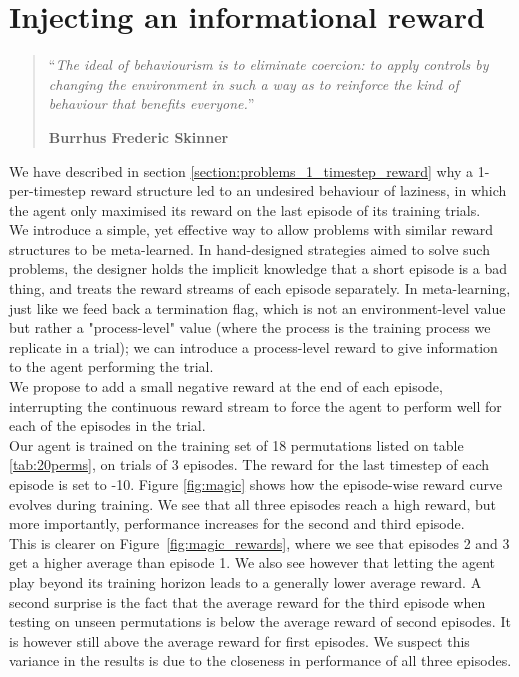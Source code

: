 \chapter{Injecting an informational reward}
\begin{quotation}
\noindent ``\emph{The ideal of behaviourism is to eliminate coercion: to apply
	controls by changing the environment in such a way as to reinforce the
	kind of behaviour that benefits everyone.}''
\begin{flushright}\textbf{Burrhus Frederic Skinner}\end{flushright}
\end{quotation}
\vspace*{0.5cm}


We have described in section \ref{section:problems_1_timestep_reward} why
a 1-per-timestep reward structure led to an undesired behaviour of laziness,
in which the agent only maximised its reward on the last episode of its
training trials.\\

We introduce a simple, yet effective way to allow problems with similar 
reward structures to be meta-learned. In hand-designed strategies aimed to
solve such problems, the designer holds the implicit knowledge that a short
episode is a bad thing, and treats the reward streams of each episode 
separately. In meta-learning, just like we feed back a termination flag, which
is not an environment-level value but rather a "process-level" value (where
the process is the training process we replicate in a trial); we can
introduce a process-level reward to give information to the agent 
performing the trial.\\

We propose to add a small negative reward at the end of each episode, 
interrupting the continuous reward stream to force the agent to perform
well for each of the episodes in the trial.\\

Our agent is trained on the training set of 18 permutations listed on table
\ref{tab:20perms}, on trials of 3 episodes. The reward for the last 
timestep of each episode is set to -10. Figure \ref{fig:magic} shows how
the episode-wise reward curve evolves during training. We see that all
three episodes reach a high reward, but more importantly, performance
increases for the second and third episode. \\

This is clearer on Figure~\ref{fig:magic_rewards}, where we see
that episodes 2 and 3 get a higher average than episode 1. We also see
however that letting the agent play beyond its training horizon leads to
a generally lower average reward. A second surprise is the fact that the
average reward for the third episode when testing on unseen permutations is
below the average reward of second episodes. It is however still above the average
reward for first episodes. We suspect this variance in the results is due
to the closeness in performance of all three episodes.\\

